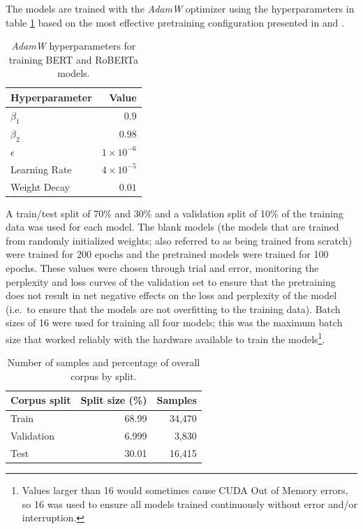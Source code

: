 \documentclass[12pt]{article}
\begin{document}
The models are trained with the \textit{AdamW} optimizer \cite{loshchilov_decoupled_2019} using the hyperparameters in table \ref{tab:optim_params}
based on the most effective pretraining configuration presented in \cite{devlin_bert_2019} and \cite{liu_roberta_2019}.

\begin{table}[!t]
    \centering
    \begin{tabular}{l r}
        \toprule
        Hyperparameter & Value              \\
        \midrule
        $\beta_1$      & $0.9$              \\
        $\beta_2$      & $0.98$             \\
        $\epsilon$     & $1 \times 10^{-6}$ \\
        Learning Rate  & $4 \times 10^{-5}$ \\
        Weight Decay   & $0.01$             \\
        \bottomrule
    \end{tabular}
    \caption{\textit{AdamW} hyperparameters for training BERT and RoBERTa models.}
    \label{tab:optim_params}
\end{table}

A train/test split of 70\% and 30\% and a validation split of 10\% of the training data was used for each model. The blank models (the models that are
trained from randomly initialized weights; also referred to as being trained from scratch) were trained for 200 epochs and the pretrained models were
trained for 100 epochs. These values were chosen through trial and error, monitoring the perplexity and loss curves of the
validation set to ensure that the pretraining does not result in net negative effects on the loss and perplexity of the model (i.e.~to ensure that the
models are not overfitting to the training data). Batch sizes of 16 were used for training all four models; this was the maximum batch size that
worked reliably with the hardware available to train the models\footnote{Values larger than 16 would sometimes cause CUDA Out of Memory errors, so 16
    was used to ensure all models trained continuously without error and/or interruption.}.

\begin{table}
    \centering
    \begin{tabular}{l r r}
        \toprule
        Corpus split & Split size (\%) & Samples \\
        \midrule
        Train        & 68.99           & 34,470  \\
        Validation   & 6.999           & 3,830   \\
        Test         & 30.01           & 16,415  \\
        \bottomrule
    \end{tabular}
    \caption{Number of samples and percentage of overall corpus by split.}
    \label{tab:corpus_splits}
\end{table}
\end{document}
